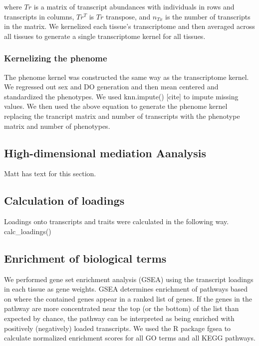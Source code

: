 \documentclass[
]{article}
\begin{document}
where \(Tr\) is a matrix of transcript abundances with individuals in
rows and transcripts in columns, \(Tr^T\) is \(Tr\) transpose, and
\(n_{Tx}\) is the number of transcripts in the matrix. We kernelized
each tissue's transcriptome and then averaged across all tissues to
generate a single transcriptome kernel for all tissues.

\subsubsection{Kernelizing the phenome}\label{kernelizing-the-phenome}

The phenome kernel was constructed the same way as the transcriptome
kernel. We regressed out sex and DO generation and then mean centered
and standardized the phenotypes. We used knn.impute() {[}cite{]} to
impute missing values. We then used the above equation to generate the
phenome kernel replacing the trancript matrix and number of transcripts
with the phenotype matrix and number of phenotypes.

\subsection{High-dimensional mediation
Aanalysis}\label{high-dimensional-mediation-aanalysis}

Matt has text for this section.

\subsection{Calculation of loadings}\label{calculation-of-loadings}

Loadings onto transcripts and traits were calculated in the following
way. calc\_loadings()

\subsection{Enrichment of biological
terms}\label{enrichment-of-biological-terms}

We performed gene set enrichment analysis (GSEA) \cite{pmid16199517}
using the transcript loadings in each tissue as gene weights. GSEA
determines enrichment of pathways based on where the contained genes
appear in a ranked list of genes. If the genes in the pathway are more
concentrated near the top (or the bottom) of the list than expected by
chance, the pathway can be interpreted as being enriched with positively
(negatively) loaded transcripts. We used the R package fgsea
\cite{fgsea} to calculate normalized enrichment scores for all GO terms
and all KEGG pathways.
\end{document}
